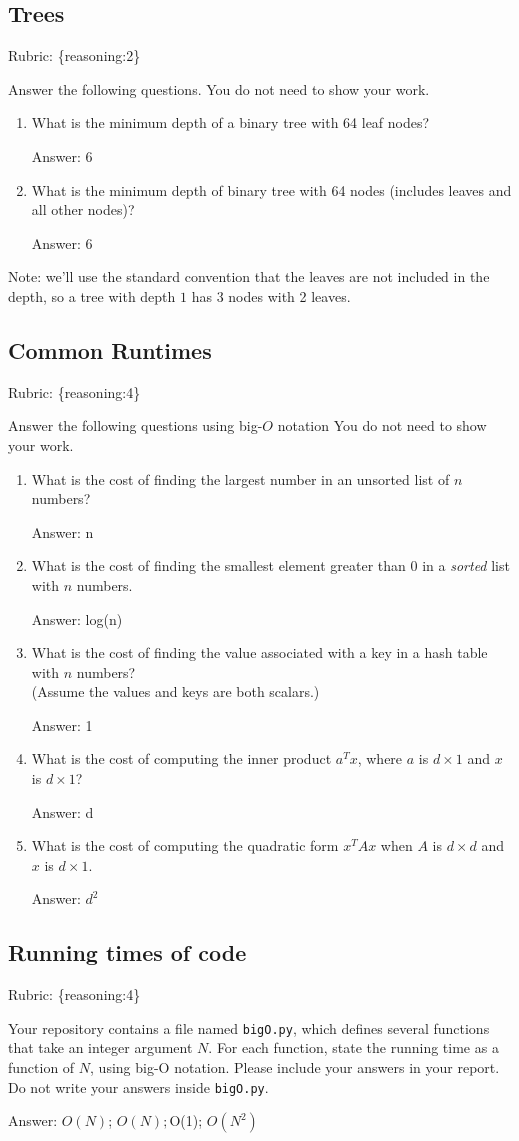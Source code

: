 \documentclass{article}
\def\rubric#1{\gre{Rubric: \{#1\}}}{}
\def\ans#1{\par\gre{Answer: #1}}
\def\blu#1{{\color{blu}#1}}
\def\gre#1{{\color{gre}#1}}
\begin{document}
\subsection{Trees}
\rubric{reasoning:2}

\blu{Answer the following questions.} You do not need to show your work.

\begin{enumerate}
\item What is the minimum depth of a binary tree with 64 leaf nodes?
 \ans{6}
\item What is the minimum depth of binary tree with 64 nodes (includes leaves and all other nodes)?
 \ans{6}
\end{enumerate}
Note: we'll use the standard convention that the leaves are not included in the depth, so a tree with depth $1$ has 3 nodes with 2 leaves.

\subsection{Common Runtimes}
\rubric{reasoning:4}

\blu{Answer the following questions using big-$O$ notation} You do not need to show your work.
\begin{enumerate}
\item What is the cost of finding the largest number in an unsorted list of $n$ numbers?
 \ans{n}
\item What is the cost of finding the smallest element greater than 0 in a \emph{sorted} list with $n$ numbers.
 \ans{log(n)}
\item What is the cost of finding the value associated with a key in a hash table with $n$ numbers? \\(Assume the values and keys are both scalars.)
 \ans{1}
\item What is the cost of computing the inner product $a^Tx$, where $a$ is $d \times 1$ and $x$ is $d \times 1$?
 \ans{d}
\item What is the cost of computing the quadratic form $x^TAx$ when $A$ is $d \times d$ and $x$ is $d \times 1$.
 \ans{$d^2$}
\end{enumerate}

\subsection{Running times of code}
\rubric{reasoning:4}

Your repository contains a file named \texttt{bigO.py}, which defines several functions
that take an integer argument $N$. For each function, \blu{state the running time as a function of $N$, using big-O notation}.
Please include your answers in your report. Do not write your answers inside \texttt{bigO.py}.
 \ans{$O(N)$; $O(N); $O(1); $O(N^2)$}
\end{document}
